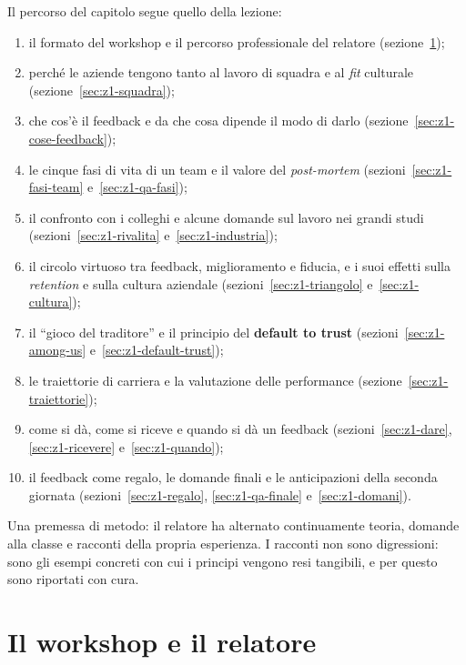 Il percorso del capitolo segue quello della lezione:
\begin{enumerate}
  \item il formato del workshop e il percorso professionale del relatore
        (sezione~\ref{sec:z1-relatore});
  \item perché le aziende tengono tanto al lavoro di squadra e al
        \emph{fit} culturale (sezione~\ref{sec:z1-squadra});
  \item che cos'è il feedback e da che cosa dipende il modo di darlo
        (sezione~\ref{sec:z1-cose-feedback});
  \item le cinque fasi di vita di un team e il valore del
        \emph{post-mortem} (sezioni~\ref{sec:z1-fasi-team}
        e~\ref{sec:z1-qa-fasi});
  \item il confronto con i colleghi e alcune domande sul lavoro nei grandi
        studi (sezioni~\ref{sec:z1-rivalita} e~\ref{sec:z1-industria});
  \item il circolo virtuoso tra feedback, miglioramento e fiducia, e i suoi
        effetti sulla \emph{retention} e sulla cultura aziendale
        (sezioni~\ref{sec:z1-triangolo} e~\ref{sec:z1-cultura});
  \item il ``gioco del traditore'' e il principio del
        \textbf{default to trust} (sezioni~\ref{sec:z1-among-us}
        e~\ref{sec:z1-default-trust});
  \item le traiettorie di carriera e la valutazione delle performance
        (sezione~\ref{sec:z1-traiettorie});
  \item come si dà, come si riceve e quando si dà un feedback
        (sezioni~\ref{sec:z1-dare}, \ref{sec:z1-ricevere}
        e~\ref{sec:z1-quando});
  \item il feedback come regalo, le domande finali e le anticipazioni
        della seconda giornata (sezioni~\ref{sec:z1-regalo},
        \ref{sec:z1-qa-finale} e~\ref{sec:z1-domani}).
\end{enumerate}

Una premessa di metodo: il relatore ha alternato continuamente teoria,
domande alla classe e racconti della propria esperienza. I racconti non sono
digressioni: sono gli esempi concreti con cui i principi vengono resi
tangibili, e per questo sono riportati con cura.

\section{Il workshop e il relatore}
\label{sec:z1-relatore}

